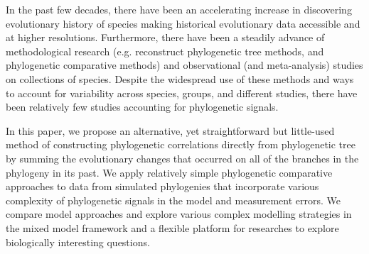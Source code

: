 In the past few decades, there have been an accelerating increase in discovering evolutionary history of species making historical evolutionary data accessible and at higher resolutions.
Furthermore, there have been a steadily advance of methodological research (e.g. reconstruct phylogenetic tree methods, and phylogenetic comparative methods) and observational (and meta-analysis) studies on collections of species. 
Despite the widespread use of these methods and ways to account for variability across species, groups, and different studies, there have been relatively few studies accounting for phylogenetic signals. 





In this paper, we propose an alternative, yet straightforward but little-used method of constructing phylogenetic correlations directly from phylogenetic tree by summing the evolutionary changes that occurred on all of the branches in the phylogeny in its past.
We apply relatively simple phylogenetic comparative approaches to data from simulated phylogenies that incorporate various complexity of phylogenetic signals in the model and measurement errors. 
We compare model approaches and explore various complex modelling strategies in the mixed model framework and a flexible platform for researches to explore biologically interesting questions.

